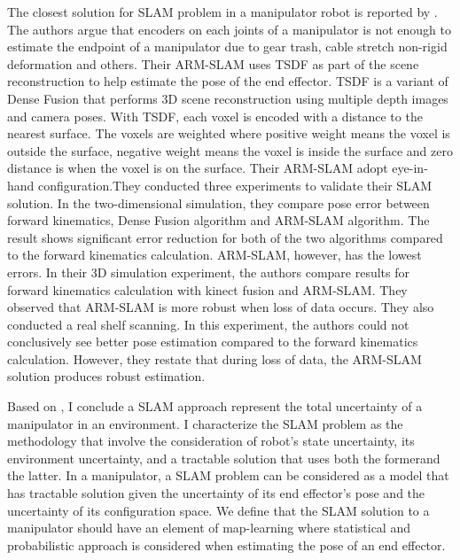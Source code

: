 The closest solution for SLAM problem in a manipulator robot is reported by
\textcite{Klingensmith2016}. The authors argue that encoders on each joints of a manipulator is
not enough to estimate the endpoint of a manipulator due to gear trash, cable stretch non-rigid
deformation and others. Their \acrfull{ARM-SLAM} uses 
\acrfull{TSDF} as part of the scene
reconstruction to help estimate the pose of the end effector. TSDF is a variant of Dense Fusion
that performs 3D scene reconstruction using multiple depth images and camera poses. With
TSDF, each voxel is encoded with a distance to the nearest surface. The voxels are weighted
where positive weight means the voxel is outside the surface, negative weight means the voxel
is inside the surface and zero distance is when the voxel is on the surface. Their ARM-SLAM
adopt eye-in-hand configuration.They conducted three experiments to validate their SLAM
solution. In the two-dimensional simulation, they compare pose error between forward
kinematics, Dense Fusion algorithm and ARM-SLAM algorithm. The result shows significant
error reduction for both of the two algorithms compared to the forward kinematics calculation.
ARM-SLAM, however, has the lowest errors. In their 3D simulation experiment, the authors
compare results for forward kinematics calculation with kinect fusion and ARM-SLAM. They
observed that ARM-SLAM is more robust when loss of data occurs. They also conducted a real
shelf scanning. In this experiment, the authors could not conclusively see better pose estimation
compared to the forward kinematics calculation. However, they restate that during loss of data,
the ARM-SLAM solution produces robust estimation.

Based on \textcite{Klingensmith2016}, I conclude a SLAM approach represent the total uncertainty of a manipulator in an environment.
 I characterize the SLAM problem as the methodology that involve the consideration of robot’s
state uncertainty, its environment uncertainty, and a tractable solution that uses both the formerand the latter.
In a manipulator, a SLAM problem can be considered as a model that has tractable solution
given the uncertainty of its end effector’s pose and the uncertainty of its configuration space. We
define that the SLAM solution to a manipulator should have an element of map-learning where
statistical and probabilistic approach is considered when estimating the pose of an end effector.

